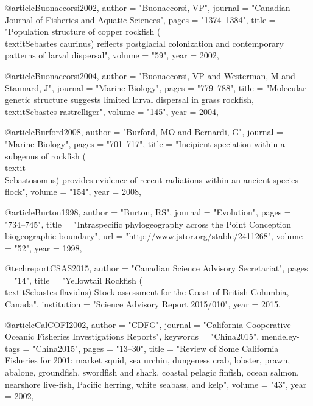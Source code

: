 @article{Buonaccorsi2002,
    author = "{Buonaccorsi, VP}",
    journal = "{Canadian Journal of Fisheries and Aquatic Sciences}",
    pages = "{1374--1384}",
    title = "{{Population structure of copper rockfish (\\textit{{Sebastes} caurinus}) reflects postglacial colonization and contemporary patterns of larval dispersal}}",
    volume = "{59}",
    year = 2002,
}

@article{Buonaccorsi2004,
    author = "{Buonaccorsi, VP and Westerman, M and Stannard, J}",
    journal = "{Marine Biology}",
    pages = "{779--788}",
    title = "{{Molecular genetic structure suggests limited larval dispersal in grass rockfish, \\textit{{Sebastes} rastrelliger}}}",
    volume = "{145}",
    year = 2004,
}

@article{Burford2008,
    author = "{Burford, MO and Bernardi, G}",
    journal = "{Marine Biology}",
    pages = "{701--717}",
    title = "{{Incipient speciation within a subgenus of rockfish (\\textit\\{Sebastosomus}) provides evidence of recent radiations within an ancient species flock}}",
    volume = "{154}",
    year = 2008,
}

@article{Burton1998,
    author = "{Burton, RS}",
    journal = "{Evolution}",
    pages = "{734--745}",
    title = "{{Intraspecific phylogeography across the Point Conception biogeographic boundary}}",
    url = "{http://www.jstor.org/stable/2411268}",
    volume = "{52}",
    year = 1998,
}

@techreport{CSAS2015,
    author = "{{Canadian Science Advisory Secretariat}}",
    pages = "{14}",
    title = "{{Yellowtail Rockfish (\\textit{{Sebastes} flavidus}) Stock assessment for the Coast of British Columbia, Canada}}",
    institution = "{{Science Advisory Report 2015/010}}",
    year = 2015,
}

@article{CalCOFI2002,
    author = "{CDFG}",
    journal = "{California Cooperative Oceanic Fisheries Investigations Reports}",
    keywords = "{China2015}",
    mendeley-tags = "{China2015}",
    pages = "{13--30}",
    title = "{{Review of Some California Fisheries for 2001: market squid, sea urchin, dungeness crab, lobster, prawn, abalone, groundfish, swordfish and shark, coastal pelagic finfish, ocean salmon, nearshore live-fish, Pacific herring, white seabass, and kelp}}",
    volume = "{43}",
    year = 2002,
}

